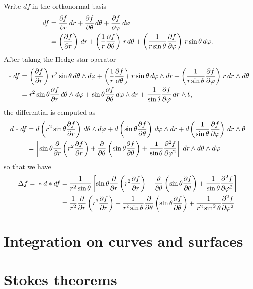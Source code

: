 \documentclass{../../large}
\begin{document}
\begin{pf}
Write $df$ in the orthonormal basis
\begin{align*}
df&=\pd{f}{r}\,dr+\pd{f}{\theta}\,d\theta+\pd{f}{\f}\,d\f\\
&=\left(\pd{f}{r}\right)\,dr+\left(\frac1r\pd{f}{\theta}\right)\,r\,d\theta+\left(\frac1{r\sin\theta}\pd{f}{\f}\right)\,r\sin\theta\,d\f.
\end{align*}
After taking the Hodge star operator
\begin{align*}
{}*df&=\left(\pd{f}{r}\right)\,r^2\sin\theta\,d\theta\wedge d\f+\left(\frac1r\pd{f}{\theta}\right)\,r\sin\theta\,d\f\wedge dr+\left(\frac1{r\sin\theta}\pd{f}{\f}\right)\,r\,dr\wedge d\theta\\
&=r^2\sin\theta\pd{f}{r}\,d\theta\wedge d\f+\sin\theta\pd{f}{\theta}\,d\f\wedge dr+\frac1{\sin\theta}\pd{f}{\f}\,dr\wedge\theta,
\end{align*}
the differential is computed as
\begin{align*}
d*df&=d\left(r^2\sin\theta\pd{f}{r}\right)\,d\theta\wedge d\f+d\left(\sin\theta\pd{f}{\theta}\right)\,d\f\wedge dr+d\left(\frac1{\sin\theta}\pd{f}{\f}\right)\,dr\wedge\theta\\
&=\left[\sin\theta\pd{r}\left(r^2\pd{f}{r}\right)+\pd{\theta}\left(\sin\theta\pd{f}{\theta}\right)+\frac1{\sin\theta}\pd[2]{f}{\f}\right]\,dr\wedge d\theta\wedge d\f,
\end{align*}
so that we have
\begin{align*}
\Delta f={}*d*df&=\frac1{r^2\sin\theta}\left[\sin\theta\pd{r}\left(r^2\pd{f}{r}\right)+\pd{\theta}\left(\sin\theta\pd{f}{\theta}\right)+\frac1{\sin\theta}\pd[2]{f}{\f}\right]\\
&=\frac1{r^2}\pd{r}\left(r^2\pd{f}{r}\right)+\frac1{r^2\sin\theta}\pd{\theta}\left(\sin\theta\pd{f}{\theta}\right)+\frac1{r^2\sin^2\theta}\pd[2]{f}{\f}
\end{align*}

\end{pf}





\section{Integration on curves and surfaces}

\begin{prb}
\end{prb}

\begin{prb}
\end{prb}


\section{Stokes theorems}
\begin{prb}
\end{prb}

\begin{prb}
\end{prb}

\begin{prb}
\end{prb}
\end{document}
